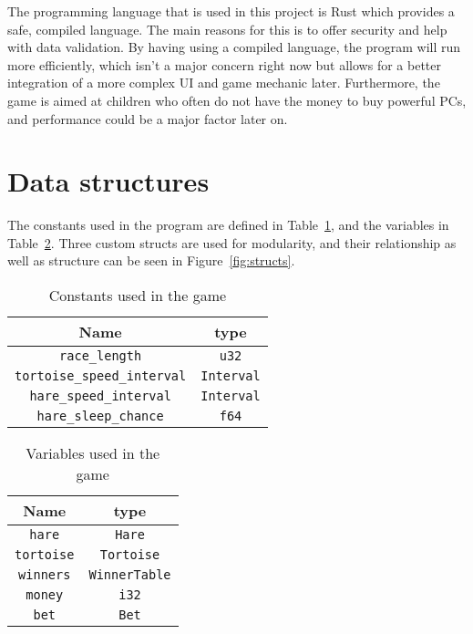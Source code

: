\documentclass[11pt]{article}
\begin{document}
    The programming language that is used in this project is Rust \cite{rust} which provides a 
    safe, compiled language. The main reasons for this is to offer security and help with data
    validation. By having using a compiled language, the program will run more efficiently, which
    isn't a major concern right now but allows for a better integration of a more complex UI and 
    game mechanic later. Furthermore, the game is aimed at children who often do not have the money
    to buy powerful PCs, and performance could be a major factor later on.

    \section{Data structures}
    The constants used in the program are defined in Table~\ref{tab:consts}, and the variables
    in Table~\ref{tab:vars}. Three custom structs are used for modularity, and their relationship as
    well as structure can be seen in Figure~\ref{fig:structs}.

    \begin{table}[!ht]
        \centering
        \begin{tabular}{ | c c | }
            \hline
            Name & type \\
            \hline
            \texttt{race\_length} & \texttt{u32} \\ 
            \texttt{tortoise\_speed\_interval} & \texttt{Interval} \\
            \texttt{hare\_speed\_interval} & \texttt{Interval} \\
            \texttt{hare\_sleep\_chance} & \texttt{f64} \\
            \hline
        \end{tabular}
        \caption{Constants used in the game}%
        \label{tab:consts}
    \end{table}
    \begin{table}[!ht]
        \centering
        \begin{tabular}{ | c c | }
            \hline
            Name & type \\
            \hline
            \texttt{hare} & \texttt{Hare} \\ 
            \texttt{tortoise} & \texttt{Tortoise} \\
            \texttt{winners} & \texttt{WinnerTable} \\
            \texttt{money} & \texttt{i32} \\
            \texttt{bet} & \texttt{Bet} \\
            \hline
        \end{tabular}
        \caption{Variables used in the game}
        \label{tab:vars}
    \end{table}
\end{document}

